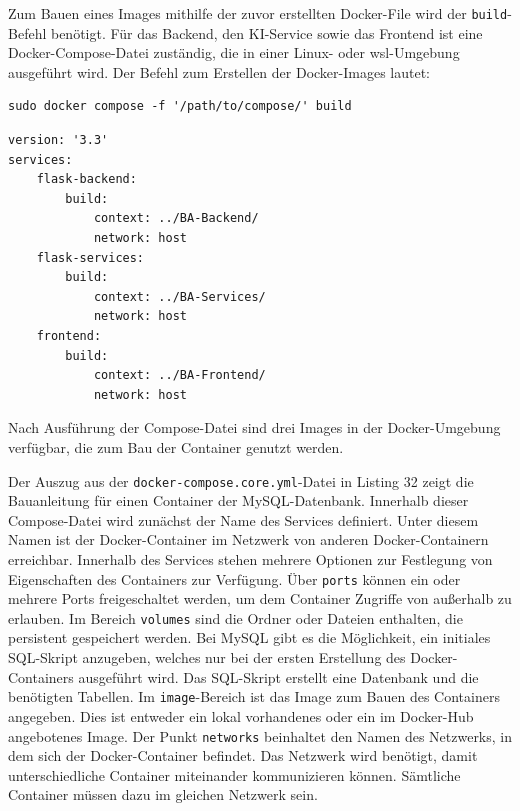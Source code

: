 Zum Bauen eines Images mithilfe der zuvor erstellten Docker-File wird der \texttt{build}-Befehl benötigt. Für das Backend, den KI-Service sowie das Frontend ist eine Docker-Compose-Datei zuständig, die in einer Linux- oder \ac{wsl}-Umgebung ausgeführt wird. Der Befehl zum Erstellen der Docker-Images lautet:
\begin{lstlisting}[caption={Build Befehl zur Erstellung von Docker-Images aus einer Compose-Datei}]
sudo docker compose -f '/path/to/compose/' build
\end{lstlisting}

\begin{lstlisting}[caption={Docker-Compose-Datei zum Bauen der Docker-Images}]
version: '3.3'
services: 
    flask-backend:
        build: 
            context: ../BA-Backend/
            network: host
    flask-services:
        build:
            context: ../BA-Services/
            network: host
    frontend:
        build:
            context: ../BA-Frontend/
            network: host
\end{lstlisting}

Nach Ausführung der Compose-Datei sind drei Images in der Docker-Umgebung verfügbar, die zum Bau der Container genutzt werden. 

Der Auszug aus der \texttt{docker-compose.core.yml}-Datei in Listing 32 zeigt die Bauanleitung für einen Container der MySQL-Datenbank. Innerhalb dieser Compose-Datei wird zunächst der Name des Services definiert. Unter diesem Namen ist der Docker-Container im Netzwerk von anderen Docker-Containern erreichbar. Innerhalb des Services stehen mehrere Optionen zur Festlegung von Eigenschaften des Containers zur Verfügung. Über \texttt{ports} können ein oder mehrere Ports freigeschaltet werden, um dem Container Zugriffe von außerhalb zu erlauben. Im Bereich \texttt{volumes} sind die Ordner oder Dateien enthalten, die persistent gespeichert werden. Bei MySQL gibt es die Möglichkeit, ein initiales SQL-Skript anzugeben, welches nur bei der ersten Erstellung des Docker-Containers ausgeführt wird. Das SQL-Skript erstellt eine Datenbank und die benötigten Tabellen. Im \texttt{image}-Bereich ist das Image zum Bauen des Containers angegeben. Dies ist entweder ein lokal vorhandenes oder ein im Docker-Hub angebotenes Image. Der Punkt \texttt{networks} beinhaltet den Namen des Netzwerks, in dem sich der Docker-Container befindet. Das Netzwerk wird benötigt, damit unterschiedliche Container miteinander kommunizieren können. Sämtliche Container müssen dazu im gleichen Netzwerk sein.

